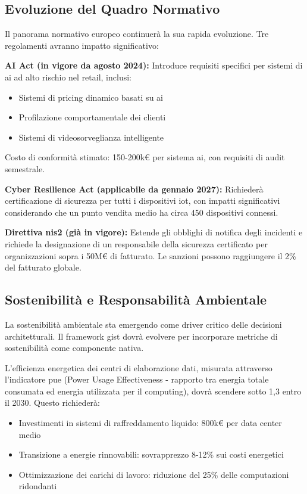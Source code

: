 \subsection{\texorpdfstring{Evoluzione del Quadro Normativo}{5.5.2 - Evoluzione del Quadro Normativo}}
\label{subsec:5.5.2}

Il panorama normativo europeo continuerà la sua rapida evoluzione. Tre regolamenti avranno impatto significativo:

\textbf{AI Act (in vigore da agosto 2024):} Introduce requisiti specifici per sistemi di \gls{ai} ad alto rischio nel retail, inclusi:
\begin{itemize}
\item Sistemi di pricing dinamico basati su \gls{ai}
\item Profilazione comportamentale dei clienti
\item Sistemi di videosorveglianza intelligente
\end{itemize}

Costo di conformità stimato: 150-200k€ per sistema \gls{ai}, con requisiti di audit semestrale.

\textbf{Cyber Resilience Act (applicabile da gennaio 2027):} Richiederà certificazione di sicurezza per tutti i dispositivi \gls{iot}, con impatti significativi considerando che un punto vendita medio ha circa 450 dispositivi connessi.

\textbf{Direttiva \gls{nis2} (già in vigore):} Estende gli obblighi di notifica degli incidenti e richiede la designazione di un responsabile della sicurezza certificato per organizzazioni sopra i 50M€ di fatturato. Le sanzioni possono raggiungere il 2\% del fatturato globale.

\subsection{\texorpdfstring{Sostenibilità e Responsabilità Ambientale}{5.5.3 - Sostenibilità e Responsabilità Ambientale}}
\label{subsec:5.5.3}

La sostenibilità ambientale sta emergendo come driver critico delle decisioni architetturali. Il framework \gls{gist} dovrà evolvere per incorporare metriche di sostenibilità come componente nativa.

L'efficienza energetica dei centri di elaborazione dati, misurata attraverso l'indicatore \gls{pue} (Power Usage Effectiveness - rapporto tra energia totale consumata ed energia utilizzata per il computing), dovrà scendere sotto 1,3 entro il 2030. Questo richiederà:
\begin{itemize}
\item Investimenti in sistemi di raffreddamento liquido: 800k€ per data center medio
\item Transizione a energie rinnovabili: sovrapprezzo 8-12\% sui costi energetici
\item Ottimizzazione dei carichi di lavoro: riduzione del 25\% delle computazioni ridondanti
\end{itemize}

